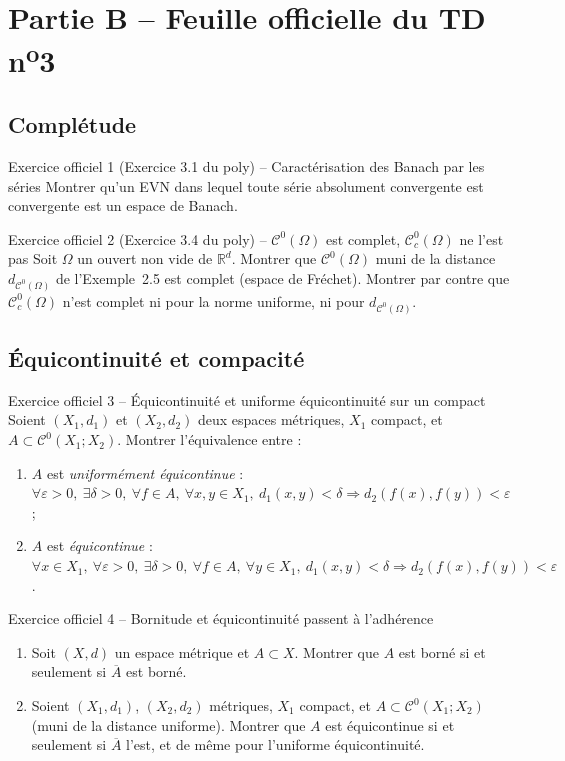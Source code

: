 \documentclass[11pt,a4paper]{article}
\newcommand{\R}{\mathbb{R}}
\newcommand{\adh}[1]{\overline{#1}}
\newcommand{\Cz}{\mathcal{C}^0}
\newcommand{\Cc}{\mathcal{C}^0_c}
\theoremstyle{definition}
\begin{document}
\section*{Partie B -- Feuille officielle du TD n\textsuperscript{o}3}

\subsection*{Complétude}

\begin{exo}{Exercice officiel 1 (Exercice 3.1 du poly) -- Caractérisation des Banach par les séries}
Montrer qu'un EVN dans lequel toute série absolument convergente est convergente est un espace de Banach.
\end{exo}

\begin{exo}{Exercice officiel 2 (Exercice 3.4 du poly) -- $\Cz(\Omega)$ est complet, $\Cc(\Omega)$ ne l'est pas}
Soit $\Omega$ un ouvert non vide de $\R^d$. Montrer que $\Cz(\Omega)$ muni de la distance $d_{\Cz(\Omega)}$ de l'Exemple~2.5 est complet (espace de Fréchet). Montrer par contre que $\Cc(\Omega)$ n'est complet ni pour la norme uniforme, ni pour $d_{\Cz(\Omega)}$.
\end{exo}

\subsection*{Équicontinuité et compacité}

\begin{exo}{Exercice officiel 3 -- Équicontinuité et uniforme équicontinuité sur un compact}
Soient $(X_1,d_1)$ et $(X_2,d_2)$ deux espaces métriques, $X_1$ compact, et $A\subset\Cz(X_1;X_2)$. Montrer l'équivalence entre :
\begin{enumerate}[label=\alph*)]
  \item $A$ est \emph{uniformément équicontinue} : $\forall\varepsilon>0,\ \exists\delta>0,\ \forall f\in A,\ \forall x,y\in X_1,\ d_1(x,y)<\delta\Rightarrow d_2(f(x),f(y))<\varepsilon$ ;
  \item $A$ est \emph{équicontinue} : $\forall x\in X_1,\ \forall\varepsilon>0,\ \exists\delta>0,\ \forall f\in A,\ \forall y\in X_1,\ d_1(x,y)<\delta\Rightarrow d_2(f(x),f(y))<\varepsilon$.
\end{enumerate}
\end{exo}

\begin{exo}{Exercice officiel 4 -- Bornitude et équicontinuité passent à l'adhérence}
\begin{enumerate}[label=\alph*)]
  \item Soit $(X,d)$ un espace métrique et $A\subset X$. Montrer que $A$ est borné si et seulement si $\adh A$ est borné.
  \item Soient $(X_1,d_1)$, $(X_2,d_2)$ métriques, $X_1$ compact, et $A\subset\Cz(X_1;X_2)$ (muni de la distance uniforme). Montrer que $A$ est équicontinue si et seulement si $\adh A$ l'est, et de même pour l'uniforme équicontinuité.
\end{enumerate}
\end{exo}
\end{document}
